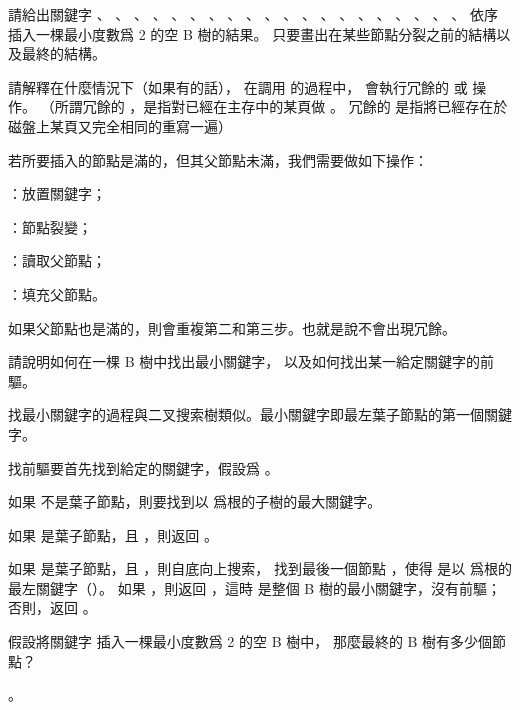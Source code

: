 \startsection[
  title={Basic operations on B-trees},
]

\startEXERCISE
請給出關鍵字 、 、 、 、 、 、 、 、 、 、
 、 、 、 、 、 、 、 、 、 、  依序
插入一棵最小度數爲 2 的空 B 樹的結果。
只要畫出在某些節點分裂之前的結構以及最終的結構。
\stopEXERCISE

\startANSWER
\externalfigure[output/e18_2_1-1]
\stopANSWER

\startEXERCISE
請解釋在什麼情況下（如果有的話），
在調用  的過程中，
會執行冗餘的  或  操作。
（所謂冗餘的 ，是指對已經在主存中的某頁做 。
冗餘的  是指將已經存在於磁盤上某頁又完全相同的重寫一遍）
\stopEXERCISE

\startANSWER
若所要插入的節點是滿的，但其父節點未滿，我們需要做如下操作：
\startigBase[2]
\item {}：放置關鍵字；
\item {}：節點裂變；
\item {}：讀取父節點；
\item {}：填充父節點。
\stopigBase

如果父節點也是滿的，則會重複第二和第三步。也就是說不會出現冗餘。
\stopANSWER

\startEXERCISE
請說明如何在一棵 B 樹中找出最小關鍵字，
以及如何找出某一給定關鍵字的前驅。
\stopEXERCISE

\startANSWER
找最小關鍵字的過程與二叉搜索樹類似。最小關鍵字即最左葉子節點的第一個關鍵字。

找前驅要首先找到給定的關鍵字，假設爲 。
\startigBase[2]
\item 如果  不是葉子節點，則要找到以  爲根的子樹的最大關鍵字。
\item 如果  是葉子節點，且 ，則返回 。
\item 如果  是葉子節點，且 ，則自底向上搜索，
找到最後一個節點 ，使得  是以  爲根的最左關鍵字（）。
如果 ，則返回 ，這時  是整個 B 樹的最小關鍵字，沒有前驅；
否則，返回 。
\stopigBase
\stopANSWER

\startEXERCISE
假設將關鍵字  插入一棵最小度數爲 2 的空 B 樹中，
那麼最終的 B 樹有多少個節點？
\stopEXERCISE

\startANSWER
{}。
\stopANSWER

